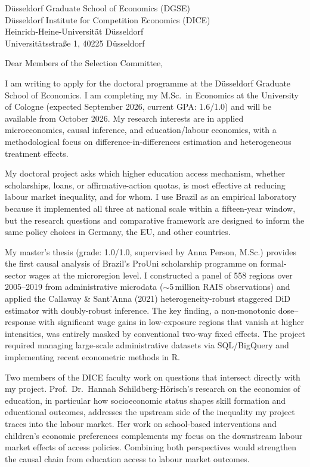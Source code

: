 \documentclass[a4paper,11pt]{letter}
\begin{document}
\begin{letter}{%
    D\"usseldorf Graduate School of Economics (DGSE) \\
    D\"usseldorf Institute for Competition Economics (DICE) \\
    Heinrich-Heine-Universit\"at D\"usseldorf \\
    Universit\"atsstra\ss e 1, 40225 D\"usseldorf
}

\opening{Dear Members of the Selection Committee,}

I am writing to apply for the doctoral programme at the D\"usseldorf Graduate School of Economics. I am completing my M.Sc.\ in Economics at the University of Cologne (expected September 2026, current GPA: 1.6/1.0) and will be available from October 2026. My research interests are in applied microeconomics, causal inference, and education/labour economics, with a methodological focus on difference-in-differences estimation and heterogeneous treatment effects.

My doctoral project asks which higher education access mechanism, whether scholarships, loans, or affirmative-action quotas, is most effective at reducing labour market inequality, and for whom. I use Brazil as an empirical laboratory because it implemented all three at national scale within a fifteen-year window, but the research questions and comparative framework are designed to inform the same policy choices in Germany, the EU, and other countries.

My master's thesis (grade: 1.0/1.0, supervised by Anna Person, M.Sc.) provides the first causal analysis of Brazil's ProUni scholarship programme on formal-sector wages at the microregion level. I constructed a panel of 558 regions over 2005--2019 from administrative microdata ($\sim$5\,million RAIS observations) and applied the Callaway \& Sant'Anna (2021) heterogeneity-robust staggered DiD estimator with doubly-robust inference. The key finding, a non-monotonic dose--response with significant wage gains in low-exposure regions that vanish at higher intensities, was entirely masked by conventional two-way fixed effects. The project required managing large-scale administrative datasets via SQL/BigQuery and implementing recent econometric methods in R.

Two members of the DICE faculty work on questions that intersect directly with my project. Prof.\ Dr.\ Hannah Schildberg-H\"orisch's research on the economics of education, in particular how socioeconomic status shapes skill formation and educational outcomes, addresses the upstream side of the inequality my project traces into the labour market. Her work on school-based interventions and children's economic preferences complements my focus on the downstream labour market effects of access policies. Combining both perspectives would strengthen the causal chain from education access to labour market outcomes.


\end{letter}
\end{document}
